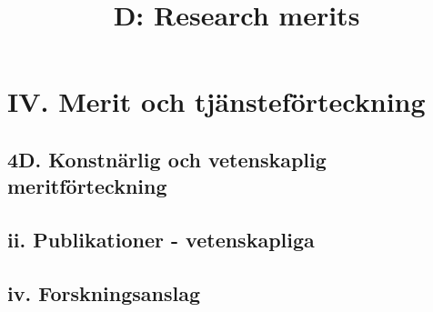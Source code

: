 \documentclass[a4paper]{article}
\title{D: Research merits}
\date{}
\begin{document}

\thispagestyle{empty}

\section*{\textsf{IV. Merit och tjänsteförteckning}}
\subsection*{\textsf{4D. Konstnärlig och vetenskaplig meritförteckning}}

\vspace{1cm}


\subsection*{\textsf{ii. Publikationer - vetenskapliga}}


\subsection*{\textsf{iv. Forskningsanslag}}



\printbibliography
\end{document}
